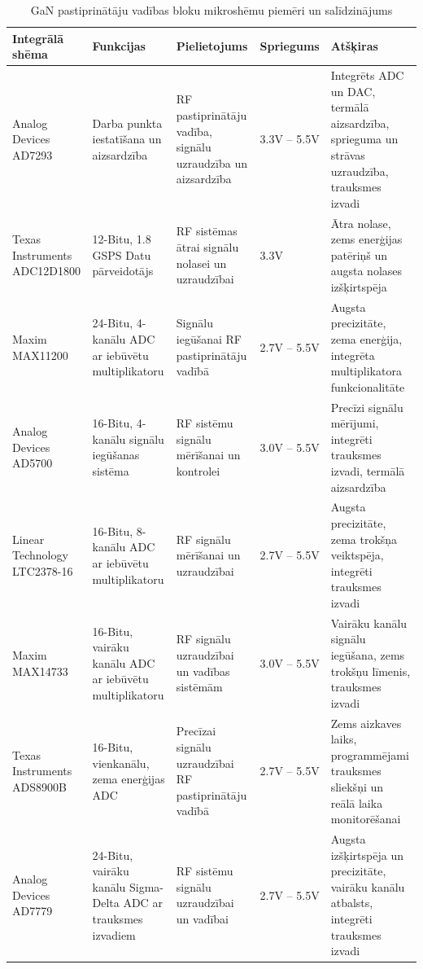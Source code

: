 \begin{table}[h]
    \centering
    \renewcommand{\arraystretch}{1.3}
    \setlength{\tabcolsep}{5pt} %
    \begin{adjustbox}{max width=\textwidth}
    \begin{tabular}{|p{3cm}|p{3cm}|p{3cm}|p{3cm}|p{4cm}|}
        \hline
        \textbf{Integrālā shēma} & \textbf{Funkcijas} & \textbf{Pielietojums} & \textbf{Spriegums} & \textbf{Atšķiras} \\
        \hline
        Analog Devices AD7293 & Darba punkta iestatīšana un aizsardzība & RF pastiprinātāju vadība, signālu uzraudzība un aizsardzība & 3.3V -- 5.5V & Integrēts ADC un DAC, termālā aizsardzība, sprieguma un strāvas uzraudzība, trauksmes izvadi \\
        \hline
        Texas Instruments ADC12D1800 & 12-Bitu, 1.8 GSPS Datu pārveidotājs & RF sistēmas ātrai signālu nolasei un uzraudzībai & 3.3V & Ātra nolase, zems enerģijas patēriņš un augsta nolases izšķirtspēja \\
        \hline
        Maxim MAX11200 & 24-Bitu, 4-kanālu ADC ar iebūvētu multiplikatoru & Signālu iegūšanai RF pastiprinātāju vadībā & 2.7V -- 5.5V & Augsta precizitāte, zema enerģija, integrēta multiplikatora funkcionalitāte \\
        \hline
        Analog Devices AD5700 & 16-Bitu, 4-kanālu signālu iegūšanas sistēma & RF sistēmu signālu mērīšanai un kontrolei & 3.0V -- 5.5V & Precīzi signālu mērījumi, integrēti trauksmes izvadi, termālā aizsardzība \\
        \hline
        Linear Technology LTC2378-16 & 16-Bitu, 8-kanālu ADC ar iebūvētu multiplikatoru & RF signālu mērīšanai un uzraudzībai & 2.7V -- 5.5V & Augsta precizitāte, zema trokšņa veiktspēja, integrēti trauksmes izvadi \\
        \hline
        Maxim MAX14733 & 16-Bitu, vairāku kanālu ADC ar iebūvētu multiplikatoru & RF signālu uzraudzībai un vadības sistēmām & 3.0V -- 5.5V & Vairāku kanālu signālu iegūšana, zems trokšņu līmenis, trauksmes izvadi \\
        \hline
        Texas Instruments ADS8900B & 16-Bitu, vienkanālu, zema enerģijas ADC & Precīzai signālu uzraudzībai RF pastiprinātāju vadībā & 2.7V -- 5.5V & Zems aizkaves laiks, programmējami trauksmes sliekšņi un reālā laika monitorēšanai \\
        \hline
        Analog Devices AD7779 & 24-Bitu, vairāku kanālu Sigma-Delta ADC ar trauksmes izvadiem & RF sistēmu signālu uzraudzībai un vadībai & 2.7V -- 5.5V & Augsta izšķirtspēja un precizitāte, vairāku kanālu atbalsts, integrēti trauksmes izvadi \\
        \hline
    \end{tabular}
    \end{adjustbox}
    \caption{GaN pastiprinātāju vadības bloku mikroshēmu piemēri un salīdzinājums}
    \label{tab:gan_control_blocks}
\end{table}

